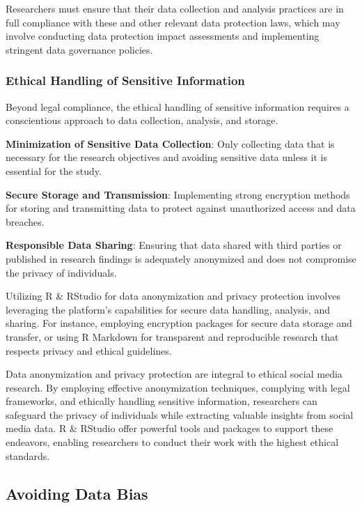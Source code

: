 \documentclass[
]{book}
\begin{document}
Researchers must ensure that their data collection and analysis practices are in full compliance with these and other relevant data protection laws, which may involve conducting data protection impact assessments and implementing stringent data governance policies.

\hypertarget{ethical-handling-of-sensitive-information}{%
\subsubsection*{Ethical Handling of Sensitive Information}\label{ethical-handling-of-sensitive-information}}

Beyond legal compliance, the ethical handling of sensitive information requires a conscientious approach to data collection, analysis, and storage.

\textbf{Minimization of Sensitive Data Collection}: Only collecting data that is necessary for the research objectives and avoiding sensitive data unless it is essential for the study.

\textbf{Secure Storage and Transmission}: Implementing strong encryption methods for storing and transmitting data to protect against unauthorized access and data breaches.

\textbf{Responsible Data Sharing}: Ensuring that data shared with third parties or published in research findings is adequately anonymized and does not compromise the privacy of individuals.

Utilizing R \& RStudio for data anonymization and privacy protection involves leveraging the platform's capabilities for secure data handling, analysis, and sharing. For instance, employing encryption packages for secure data storage and transfer, or using R Markdown for transparent and reproducible research that respects privacy and ethical guidelines.

Data anonymization and privacy protection are integral to ethical social media research. By employing effective anonymization techniques, complying with legal frameworks, and ethically handling sensitive information, researchers can safeguard the privacy of individuals while extracting valuable insights from social media data. R \& RStudio offer powerful tools and packages to support these endeavors, enabling researchers to conduct their work with the highest ethical standards.

\hypertarget{avoiding-data-bias}{%
\subsection*{Avoiding Data Bias}\label{avoiding-data-bias}}
\end{document}
